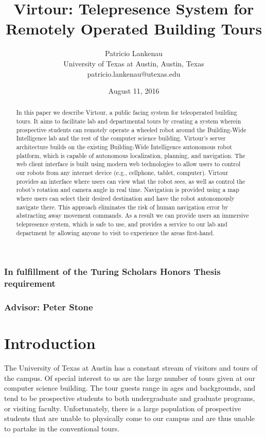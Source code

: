 \documentclass[
  oneside,
  11pt, a4paper,
  footinclude=true,
  headinclude=true,
  cleardoublepage=empty
]{article}
\title{Virtour: Telepresence System for Remotely Operated Building Tours}
\author{Patricio Lankenau\\
        University of Texas at Austin, Austin, Texas\\
        patricio.lankenau@utexas.edu\\}
\date{August 11, 2016}
\begin{document}
\maketitle

\begin{abstract}
  In this paper we describe Virtour, a public facing system for teleoperated
  building tours. It aims to facilitate lab and departmental tours by creating
  a system wherein prospective students can remotely operate a wheeled robot
  around the Building-Wide Intelligence lab and the rest of the computer
  science building. Virtour's server architecture builds on the existing
  Building-Wide Intelligence autonomous robot platform, which is capable of
  autonomous localization, planning, and navigation. The web client interface
  is built using modern web technologies to allow users to control our robots
  from any internet device (e.g., cellphone, tablet, computer). Virtour
  provides an interface where users can view what the robot sees, as well as
  control the robot's rotation and camera angle in real time. Navigation is
  provided using a map where users can select their desired destination and
  have the robot autonomously navigate there. This approach eliminates the risk
  of human navigation error by abstracting away movement commands. As a result
  we can provide users an immersive telepresence system, which is safe to use,
  and provides a service to our lab and department by allowing anyone to visit
  to experience the areas first-hand.
\end{abstract}

\vfill

\subsubsection*{\centering In fulfillment of the Turing Scholars Honors Thesis
requirement}

\subsubsection*{\centering Advisor: Peter Stone}

\newpage

\section{Introduction}\label{sec:intro}

The University of Texas at Austin has a constant stream of visitors and tours
of the campus. Of special interest to us are the large number of tours given at
our computer science building. The tour guests range in ages and backgrounds,
and tend to be prospective students to both undergraduate and graduate programs,
or visiting faculty. Unfortunately, there is a large population of prospective
students that are unable to physically come to our campus and are thus unable
to partake in the conventional tours.
\end{document}
